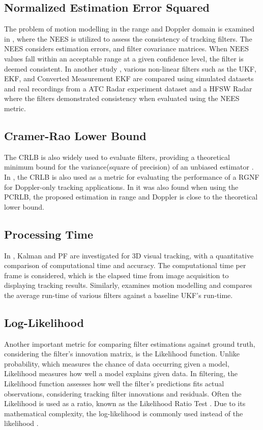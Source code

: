 \subsection{Normalized Estimation Error Squared}
The problem of motion modelling in the range and Doppler domain is examined in \cite{Li2021}, where the \ac{NEES} is utilized to assess the consistency of tracking filters. The \ac{NEES} considers estimation errors, and filter covariance matrices. When NEES values fall within an acceptable range at a given confidence level, the filter is deemed consistent. In another study \cite{ZhenDing2010}, various non-linear filters such as the \ac{UKF}, \ac{EKF}, and Converted Measurement \ac{EKF} are compared using simulated datasets and real recordings from a \ac{ATC} \ac{Radar} experiment dataset and a \ac{HFSW} \ac{Radar} where the filters demonstrated consistency when evaluated using the NEES metric.

\subsection{Cramer-Rao Lower Bound}
The \ac{CRLB} is also widely used to evaluate filters, providing a theoretical minimum bound for the variance(square of precision) of an unbiased estimator \cite{Richards2010}. In \cite{Nadjiasngar2012}, the \ac{CRLB} is also used as a metric for evaluating the performance of a \ac{RGNF} for Doppler-only tracking applications. In \cite{Li2021} it was also found when using the \ac{PCRLB}, the proposed estimation in range and Doppler is close to the theoretical lower bound.

\subsection{Processing Time}
In \cite{Salih2011}, Kalman and \ac{PF} are investigated for \ac{3D} visual tracking, with a quantitative comparison of computational time and accuracy. The computational time per frame is considered, which is the elapsed time from image acquisition to displaying tracking results. Similarly, \cite{Li2021} examines motion modelling and compares the average run-time of various filters against a baseline \ac{UKF}'s run-time.

\subsection{Log-Likelihood}
Another important metric for comparing filter estimations against ground truth, considering the filter's innovation matrix, is the Likelihood function. Unlike probability, which measures the chance of data occurring given a model, Likelihood measures how well a model explains given data. In filtering, the Likelihood function assesses how well the filter's predictions fits actual observations, considering tracking filter innovations and residuals. Often the Likelihood is used as a ratio, known as the Likelihood Ratio Test \cite{Turnbull1978}. Due to its mathematical complexity, the log-likelihood is commonly used instead of the likelihood \cite{Grewal2006}.


